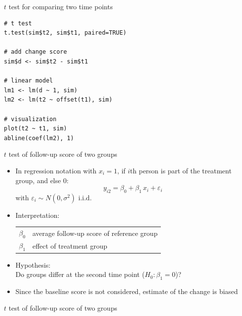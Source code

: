 \documentclass[aspectratio=169]{beamer}
\begin{document}
\begin{frame}[fragile]{$t$ test for comparing two time points}
\begin{lstlisting}
# t test
t.test(sim$t2, sim$t1, paired=TRUE)

# add change score
sim$d <- sim$t2 - sim$t1

# linear model
lm1 <- lm(d ~ 1, sim)
lm2 <- lm(t2 ~ offset(t1), sim)

# visualization
plot(t2 ~ t1, sim)
abline(coef(lm2), 1)
\end{lstlisting}
\end{frame}


\begin{frame}{$t$ test of follow-up score of two groups}
\begin{itemize}
  \item In regression notation with $x_i = 1$, if $i$th person is part of
    the treatment group, and else $0$:
    \[
      y_{i2} = \beta_0 + \beta_1 \, x_i + \varepsilon_i
    \]
    with $\varepsilon_i \sim N(0, \sigma^2)$ i.i.d.
  \item Interpretation:
    \begin{center}
    \begin{tabular}{ll}
    $\beta_0$ & average follow-up score of reference group\\
    $\beta_1$ & effect of treatment group
    \end{tabular}
    \end{center}
  \item Hypothesis:\\
        Do groups differ at the second time point ($H_0\colon \beta_1 = 0$)?
  \item Since the baseline score is not considered, estimate of the change
    is biased
\end{itemize}
\end{frame}


\begin{frame}{$t$ test of follow-up score of two groups}
\begin{center}
\end{center}
\end{frame}
\end{document}
